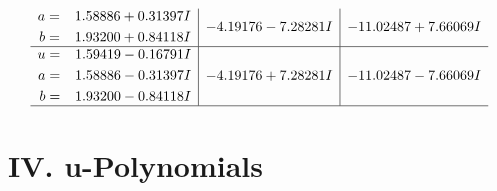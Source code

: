 \documentclass[1p]{elsarticle_modified}
\theoremstyle{definition}
\begin{document}
$$\begin{array}{c|c|c}
\begin{aligned}
a &= \phantom{-}1.58886 + 0.31397 I \\
b &= \phantom{-}1.93200 + 0.84118 I\end{aligned}
 & -4.19176 - 7.28281 I & -11.02487 + 7.66069 I \\ \hline\begin{aligned}
u &= \phantom{-}1.59419 - 0.16791 I \\
a &= \phantom{-}1.58886 - 0.31397 I \\
b &= \phantom{-}1.93200 - 0.84118 I\end{aligned}
 & -4.19176 + 7.28281 I & -11.02487 - 7.66069 I\\
 \hline 
 \end{array}$$\newpage
\newpage\renewcommand{\arraystretch}{1}
\centering \section*{ IV. u-Polynomials}
\end{document}
